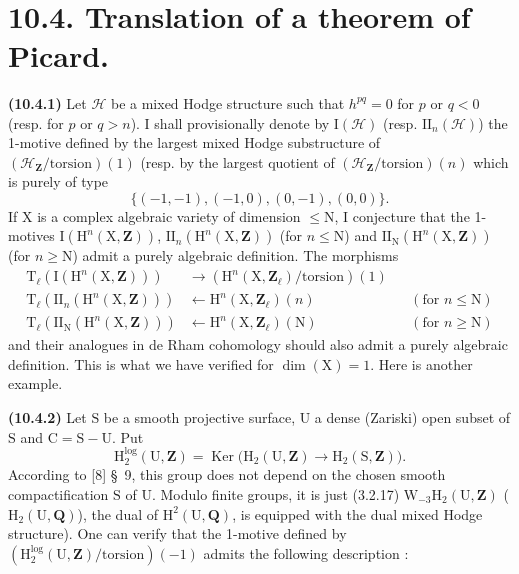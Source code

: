 \documentclass[11pt,leqno]{article}
\newcommand{\Page}[1]{\ifvmode\noindent\else\unskip\ \fi{\footnotesize\textcolor{gray}{[p.\,#1]}}\ \ignorespaces}
\begin{document}
\Page{75}
\section*{10.4. Translation of a theorem of Picard.}

\textbf{(10.4.1)} Let \(\mathcal{H}\) be a mixed Hodge structure such that \(h^{pq}=0\) for \(p\) or \(q<0\) (resp. for \(p\) or \(q>n\)). I shall provisionally denote by \(\mathrm{I}(\mathcal{H})\) (resp. \(\mathrm{II}_n(\mathcal{H})\)) the 1-motive defined by the largest mixed Hodge substructure of \((\mathcal{H}_{\mathbf{Z}}/\mathrm{torsion})(1)\) (resp. by the largest quotient of \((\mathcal{H}_{\mathbf{Z}}/\mathrm{torsion})(n)\) which is purely of type
\[
\{(-1,-1),(-1,0),(0,-1),(0,0)\}.
\]
If \(\mathrm{X}\) is a complex algebraic variety of dimension \(\leq\mathrm{N}\), I conjecture that the 1-motives \(\mathrm{I}(\mathrm{H}^{n}(\mathrm{X},\mathbf{Z}))\), \(\mathrm{II}_n(\mathrm{H}^{n}(\mathrm{X},\mathbf{Z}))\) (for \(n\leq\mathrm{N}\)) and \(\mathrm{II}_{\mathrm{N}}(\mathrm{H}^{n}(\mathrm{X},\mathbf{Z}))\) (for \(n\geq\mathrm{N}\)) admit a purely algebraic definition. The morphisms
\[
\begin{aligned}
\mathrm{T}_{\ell}(\mathrm{I}(\mathrm{H}^{n}(\mathrm{X},\mathbf{Z})))
 &\longrightarrow
 (\mathrm{H}^{n}(\mathrm{X},\mathbf{Z}_{\ell})/\mathrm{torsion})(1)\\
\mathrm{T}_{\ell}(\mathrm{II}_n(\mathrm{H}^{n}(\mathrm{X},\mathbf{Z})))
 &\longleftarrow
 \mathrm{H}^{n}(\mathrm{X},\mathbf{Z}_{\ell})(n)
 &&(\text{for }n\leq\mathrm{N})\\
\mathrm{T}_{\ell}(\mathrm{II}_{\mathrm{N}}(\mathrm{H}^{n}(\mathrm{X},\mathbf{Z})))
 &\longleftarrow
 \mathrm{H}^{n}(\mathrm{X},\mathbf{Z}_{\ell})(\mathrm{N})
 &&(\text{for }n\geq\mathrm{N})
\end{aligned}
\]
and their analogues in de Rham cohomology should also admit a purely algebraic definition. This is what we have verified for \(\dim(\mathrm{X})=1\). Here is another example.

\textbf{(10.4.2)} Let \(\mathrm{S}\) be a smooth projective surface, \(\mathrm{U}\) a dense (Zariski) open subset of \(\mathrm{S}\) and \(\mathrm{C}=\mathrm{S}-\mathrm{U}\). Put
\[
\mathrm{H}^{\log}_{2}(\mathrm{U},\mathbf{Z})
=\operatorname{Ker}\bigl(
\mathrm{H}_{2}(\mathrm{U},\mathbf{Z})
\to\mathrm{H}_{2}(\mathrm{S},\mathbf{Z})\bigr).
\]
According to [8] \S~9, this group does not depend on the chosen smooth compactification \(\mathrm{S}\) of \(\mathrm{U}\). Modulo finite groups, it is just (3.2.17) \(\mathrm{W}_{-3}\mathrm{H}_{2}(\mathrm{U},\mathbf{Z})\) (\(\mathrm{H}_{2}(\mathrm{U},\mathbf{Q})\)), the dual of \(\mathrm{H}^{2}(\mathrm{U},\mathbf{Q})\), is equipped with the dual mixed Hodge structure). One can verify that the 1-motive defined by \((\mathrm{H}^{\log}_{2}(\mathrm{U},\mathbf{Z})/\mathrm{torsion})(-1)\) admits the following description :
\end{document}
